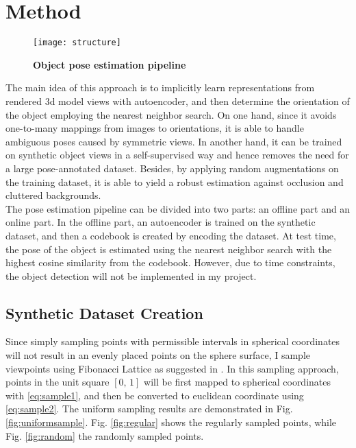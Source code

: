 \chapter{Method}

\begin{figure}[H]
	\centering
	\texttt{[image: structure]}
	\caption[Object pose estimation pipeline]{\textbf{Object pose estimation pipeline}}
	\label{fig:structure}
\end{figure}

The main idea of this approach is to implicitly learn representations from rendered 3d model views with autoencoder, and then determine the orientation of the object employing the nearest neighbor search. On one hand, since it avoids one-to-many mappings from images to orientations, it is able to handle ambiguous poses caused by symmetric views. In another hand, it can be trained on synthetic object views in a self-supervised way and hence removes the need for a large pose-annotated dataset. Besides, by applying random augmentations on the training dataset, it is able to yield a robust estimation against occlusion and cluttered backgrounds.  \\[8pt]
The pose estimation pipeline can be divided into two parts: an offline part and an online part. In the offline part, an autoencoder is trained on the synthetic dataset, and then a codebook is created by encoding the dataset. At test time, the pose of the object is estimated using the nearest neighbor search with the highest cosine similarity from the codebook. However, due to time constraints, the object detection will not be implemented in my project.  \\[8pt]






\section{Synthetic Dataset Creation}

Since simply sampling points with permissible intervals in spherical coordinates will not result in an evenly placed points on the sphere surface, I sample viewpoints using Fibonacci Lattice as suggested in \cite{deserno2004generate}. In this sampling approach, points in the unit square $[0,\,1]$ will be first mapped to spherical coordinates with \eqref{eq:sample1}, and then be converted to euclidean coordinate using \eqref{eq:sample2}. The uniform sampling results are demonstrated in Fig. \ref{fig:uniformsample}. Fig. \ref{fig:regular} shows the regularly sampled points, while Fig. \ref{fig:random} the randomly sampled points.
  
